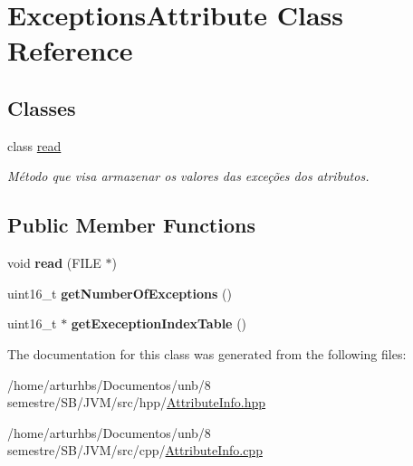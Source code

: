 \hypertarget{classExceptionsAttribute}{}\section{Exceptions\+Attribute Class Reference}
\label{classExceptionsAttribute}
\subsection*{Classes}
\begin{DoxyCompactItemize}
\item 
class \hyperlink{classExceptionsAttribute_1_1read}{read}
\begin{DoxyCompactList}\small\item\em Método que visa armazenar os valores das exceções dos atributos. \end{DoxyCompactList}\end{DoxyCompactItemize}
\subsection*{Public Member Functions}
\begin{DoxyCompactItemize}
\item 
void {\bfseries read} (F\+I\+LE $\ast$)\hypertarget{classExceptionsAttribute_abd96393a69272508d4466fa0483c3035}{}\label{classExceptionsAttribute_abd96393a69272508d4466fa0483c3035}

\item 
uint16\+\_\+t {\bfseries get\+Number\+Of\+Exceptions} ()\hypertarget{classExceptionsAttribute_a32d7b850443b14b860a544eb7a3b5308}{}\label{classExceptionsAttribute_a32d7b850443b14b860a544eb7a3b5308}

\item 
uint16\+\_\+t $\ast$ {\bfseries get\+Exeception\+Index\+Table} ()\hypertarget{classExceptionsAttribute_a09c8f830fd0e8da6ae03ab086d28b468}{}\label{classExceptionsAttribute_a09c8f830fd0e8da6ae03ab086d28b468}

\end{DoxyCompactItemize}


The documentation for this class was generated from the following files\+:\begin{DoxyCompactItemize}
\item 
/home/arturhbs/\+Documentos/unb/8 semestre/\+S\+B/\+J\+V\+M/src/hpp/\hyperlink{AttributeInfo_8hpp}{Attribute\+Info.\+hpp}\item 
/home/arturhbs/\+Documentos/unb/8 semestre/\+S\+B/\+J\+V\+M/src/cpp/\hyperlink{AttributeInfo_8cpp}{Attribute\+Info.\+cpp}\end{DoxyCompactItemize}
